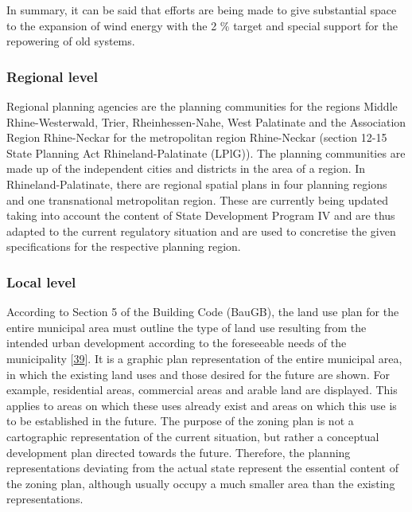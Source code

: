 \documentclass[a4paper,11pt]{article}
\begin{document}
In summary, it can be said that efforts are being made to give substantial space to the expansion of wind energy with the 2 \% target and special support for the repowering of old systems.

\hypertarget{regional-level}{%
\subsubsection{Regional level}\label{regional-level}}

Regional planning agencies are the planning communities for the regions Middle Rhine-Westerwald, Trier, Rheinhessen-Nahe, West Palatinate and the Association Region Rhine-Neckar for the metropolitan region Rhine-Neckar (section 12-15 State Planning Act Rhineland-Palatinate (LPlG)). The planning communities are made up of the independent cities and districts in the area of a region. In Rhineland-Palatinate, there are regional spatial plans in four planning regions and one transnational metropolitan region. These are currently being updated taking into account the content of State Development Program IV and are thus adapted to the current regulatory situation and are used to concretise the given specifications for the respective planning region.

\hypertarget{local-level}{%
\subsubsection{Local level}\label{local-level}}

According to Section 5 of the Building Code (BauGB), the land use plan for the entire municipal area must outline the type of land use resulting from the intended urban development according to the foreseeable needs of the municipality {[}\protect\hyperlink{ref-BundesministeriumderJustizundfurVerbraucherschutz.1960}{39}{]}. It is a graphic plan representation of the entire municipal area, in which the existing land uses and those desired for the future are shown. For example, residential areas, commercial areas and arable land are displayed. This applies to areas on which these uses already exist and areas on which this use is to be established in the future. The purpose of the zoning plan is not a cartographic representation of the current situation, but rather a conceptual development plan directed towards the future. Therefore, the planning representations deviating from the actual state represent the essential content of the zoning plan, although usually occupy a much smaller area than the existing representations.
\end{document}
